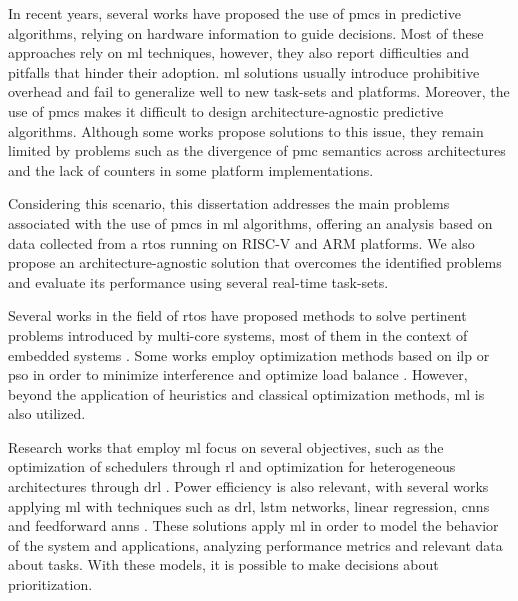 \documentclass[journal,onecolumn]{IEEEtran}
\begin{document}

In recent years, several works have proposed the use of \glspl{pmc} in predictive algorithms, relying on hardware information to guide decisions. Most of these approaches rely on \gls{ml} techniques, however, they also report difficulties and pitfalls that hinder their adoption. \gls{ml} solutions usually introduce prohibitive overhead and fail to generalize well to new task-sets and platforms. Moreover, the use of \glspl{pmc} makes it difficult to design architecture-agnostic predictive algorithms. Although some works propose solutions to this issue, they remain limited by problems such as the divergence of \gls{pmc} semantics across architectures and the lack of counters in some platform implementations.

Considering this scenario, this dissertation addresses the main problems associated with the use of \glspl{pmc} in \gls{ml} algorithms, offering an analysis based on data collected from a \gls{rtos} running on RISC-V and ARM platforms. We also propose an architecture-agnostic solution that overcomes the identified problems and evaluate its performance using several real-time task-sets.


\clearpage

Several works in the field of \gls{rtos} have proposed methods to solve pertinent problems introduced by multi-core systems, most of them in the context of embedded systems \cite{ismael2021scheduling}. Some works employ optimization methods based on \gls{ilp} or \gls{pso} in order to minimize interference and optimize load balance \cite{aceituno2023optimized, liu2021multi}. However, beyond the application of heuristics and classical optimization methods, \gls{ml} is also utilized.

Research works that employ \gls{ml} focus on several objectives, such as the optimization of schedulers through \gls{rl} and optimization for heterogeneous architectures through \gls{drl} \cite{liang2024adaptive, tan2024deep}. Power efficiency is also relevant, with several works applying \gls{ml} with techniques such as \gls{drl}, \gls{lstm} networks, linear regression, \glspl{cnn} and feedforward \glspl{ann} \cite{peng2024energy, allaqband2024efficient, khan2025enhanced, hoffmann2021online}. These solutions apply \gls{ml} in order to model the behavior of the system and applications, analyzing performance metrics and relevant data about tasks. With these models, it is possible to make decisions about prioritization.
\end{document}
